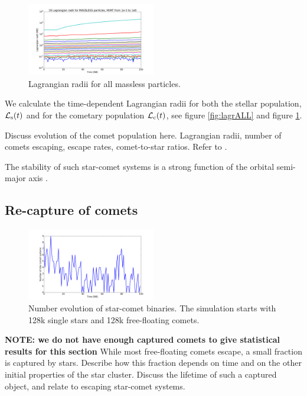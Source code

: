 \documentclass[usenatbib]{mn2e}
\newcommand{\lags}{\mathcal{L}_{\rm s}}
\newcommand{\lagc}{\mathcal{L}_{\rm c}}
\begin{document}
\begin{figure}
  \centering
  \includegraphics[width=0.5\textwidth,height=!]{lagrMASSLESS.pdf}
  \caption{Lagrangian radii for all massless particles.}
  \label{fig:lagrMASSLESS}
\end{figure}

We calculate the time-dependent Lagrangian radii for both the stellar population, $\lags(t)$ and for the cometary population $\lagc(t)$, see figure \ref{fig:lagrALL} and figure \ref{fig:lagrMASSLESS}.



Discuss evolution of the comet population here. Lagrangian radii, number of comets escaping, escape rates, comet-to-star ratios. Refer to \cite{Wang:2015ab}.

The stability of such star-comet systems is a strong function of the orbital semi-major axis \citep[e.g.,][]{Zheng:2015aa}.

\subsection{Re-capture of comets}

\begin{figure}
  \centering
  \includegraphics[width=0.5\textwidth,height=!]{Ns_c.png}
  \caption{Number evolution of star-comet binaries. The simulation starts with 128k single stars and 128k free-floating comets.}
  \label{fig:Ns_c}
\end{figure}

\textbf{NOTE: we do not have enough captured comets to give statistical results for this section}
While most free-floating comets escape, a small fraction is captured by stars. Describe how this fraction depends on time and on the other initial properties of the star cluster. Discuss the lifetime of such a captured object, and relate to escaping star-comet systems.
\end{document}
